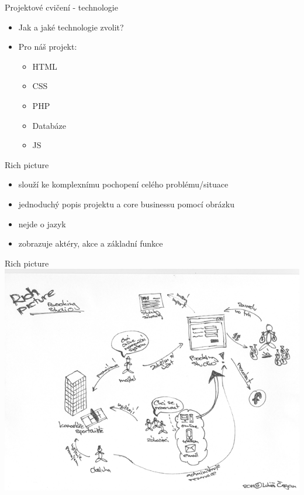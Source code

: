 \documentclass{beamer}
\begin{document}
\begin{frame}{Projektové cvičení - technologie}
	\begin{itemize}
		\item Jak a jaké technologie zvolit?
		\item Pro náš projekt:
		\begin{itemize}
			\item HTML
			\item CSS
			\item PHP
			\item Databáze
			\item JS
		\end{itemize}
	\end{itemize}
\end{frame}

\begin{frame}{Rich picture}
	\begin{itemize}
		\item slouží ke komplexnímu pochopení celého problému/situace
		\item jednoduchý popis projektu a core businessu pomocí obrázku
		\item nejde o jazyk
	\end{itemize}

	\begin{itemize}
		\item zobrazuje aktéry, akce a základní funkce
	\end{itemize}
\end{frame}

\begin{frame}{Rich picture}
  \includegraphics[width=\columnwidth]{rich-picture}
\end{frame}
\end{document}
